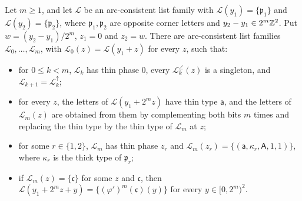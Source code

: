 \begin{lemma}\label{thr:dyadic}
Let $m\ge1$, and let $\mathcal L$ be an arc-consistent list family with $\mathcal L(y_1)=\{\mathfrak p_1\}$ and $\mathcal L(y_2)=\{\mathfrak p_2\}$, where $\mathfrak p_1,\mathfrak p_2$ are opposite corner letters and $y_2-y_1\in2^m\mathbb{Z}^2$. Put $w=(y_2-y_1)/2^m$, $z_1=0$ and $z_2=w$. There are arc-consistent list families $\mathcal L_0,\dots,\mathcal L_m$, with $\mathcal L_0(z)=\mathcal L(y_1+z)$ for every $z$, such that:
\begin{itemize}
\item[(a)] for $0\le k<m$, $\mathcal L_k$ has thin phase $0$, every $\mathcal L_k^{\angle}(z)$ is a singleton, and $\mathcal L_{k+1}=\mathcal L_k^{\uparrow}$;
\item[(b)] for every $z$, the letters of $\mathcal L(y_1+2^mz)$ have thin type $\mathsf a$, and the letters of $\mathcal L_m(z)$ are obtained from them by complementing both bits $m$ times and replacing the thin type by the thin type of $\mathcal L_m$ at $z$;
\item[(c)] for some $r\in\{1,2\}$, $\mathcal L_m$ has thin phase $z_r$ and $\mathcal L_m(z_r)=\{(\mathsf a,\kappa_r,\mathsf A,1,1)\}$, where $\kappa_r$ is the thick type of $\mathfrak p_r$;
\item[(d)] if $\mathcal L_m(z)=\{\mathfrak c\}$ for some $z$ and $\mathfrak c$, then $\mathcal L(y_1+2^mz+y)=\{(\varphi')^m(\mathfrak c)(y)\}$ for every $y\in[0,2^m)^2$.
\end{itemize}
\end{lemma}

